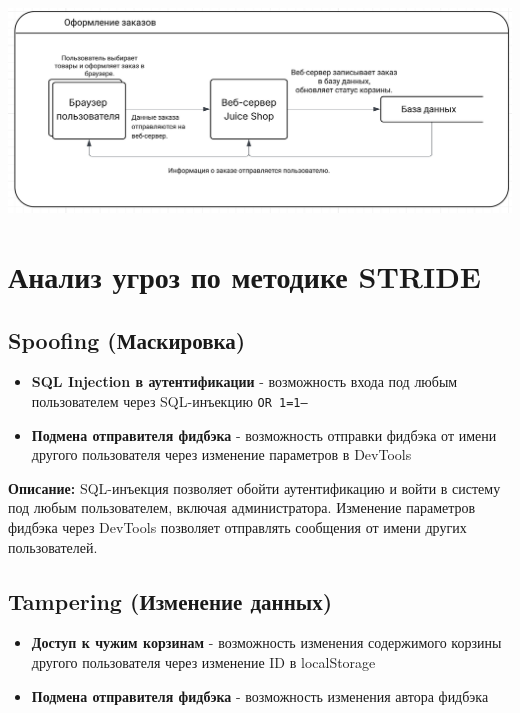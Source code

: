 \documentclass{article}
\begin{document}
\begin{center}
  \includegraphics[width=.9\textwidth]{ord}
\end{center}


\section{Анализ угроз по методике STRIDE}

\subsection{Spoofing (Маскировка)}

\begin{itemize}
    \item \textbf{SQL Injection в аутентификации} - возможность входа под любым пользователем через SQL-инъекцию \texttt{OR 1=1--}
    \item \textbf{Подмена отправителя фидбэка} - возможность отправки фидбэка от имени другого пользователя через изменение параметров в DevTools
\end{itemize}

\textbf{Описание:} SQL-инъекция позволяет обойти аутентификацию и войти в систему под любым пользователем, включая администратора. Изменение параметров фидбэка через DevTools позволяет отправлять сообщения от имени других пользователей.

\subsection{Tampering (Изменение данных)}

\begin{itemize}
    \item \textbf{Доступ к чужим корзинам} - возможность изменения содержимого корзины другого пользователя через изменение ID в localStorage
    \item \textbf{Подмена отправителя фидбэка} - возможность изменения автора фидбэка
\end{itemize}
\end{document}
